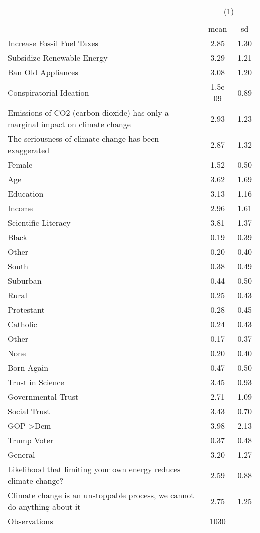 {
\def\sym#1{\ifmmode^{#1}\else\(^{#1}\)\fi}
\begin{tabular}{l*{1}{cc}}
\hline\hline
                    &\multicolumn{2}{c}{(1)}  \\
                    &\multicolumn{2}{c}{}     \\
                    &        mean&          sd\\
\hline
Increase Fossil Fuel Taxes&        2.85&        1.30\\
Subsidize Renewable Energy&        3.29&        1.21\\
Ban Old Appliances  &        3.08&        1.20\\
Conspiratorial Ideation&    -1.5e-09&        0.89\\
Emissions of CO2 (carbon dioxide) has only a marginal impact on climate change&        2.93&        1.23\\
The seriousness of climate change has been exaggerated&        2.87&        1.32\\
Female              &        1.52&        0.50\\
Age                 &        3.62&        1.69\\
Education           &        3.13&        1.16\\
Income              &        2.96&        1.61\\
Scientific Literacy &        3.81&        1.37\\
Black               &        0.19&        0.39\\
Other               &        0.20&        0.40\\
South               &        0.38&        0.49\\
Suburban            &        0.44&        0.50\\
Rural               &        0.25&        0.43\\
Protestant          &        0.28&        0.45\\
Catholic            &        0.24&        0.43\\
Other               &        0.17&        0.37\\
None                &        0.20&        0.40\\
Born Again          &        0.47&        0.50\\
Trust in Science    &        3.45&        0.93\\
Governmental Trust  &        2.71&        1.09\\
Social Trust        &        3.43&        0.70\\
GOP->Dem            &        3.98&        2.13\\
Trump Voter         &        0.37&        0.48\\
General             &        3.20&        1.27\\
Likelihood that limiting your own energy reduces climate change?&        2.59&        0.88\\
Climate change is an unstoppable process, we cannot do anything about it&        2.75&        1.25\\
\hline
Observations        &        1030&            \\
\hline\hline
\end{tabular}
}
